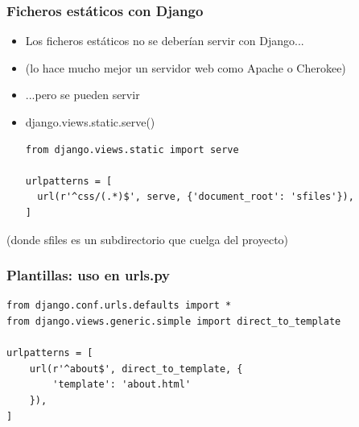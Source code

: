 
\begin{frame}[fragile]
\frametitle{Ficheros estáticos con Django}

\begin{itemize}
\item Los ficheros estáticos no se deberían servir con Django...
\item (lo hace mucho mejor un servidor web como Apache o Cherokee)
\item ...pero se pueden servir
\item django.views.static.serve()

\begin{verbatim}
from django.views.static import serve

urlpatterns = [
  url(r'^css/(.*)$', serve, {'document_root': 'sfiles'}),
]
\end{verbatim}

\end{itemize}

(donde sfiles es un subdirectorio que cuelga del proyecto)

\end{frame}



\begin{frame}[fragile]
\frametitle{Plantillas: uso en urls.py}

\begin{verbatim}
from django.conf.urls.defaults import *
from django.views.generic.simple import direct_to_template

urlpatterns = [
    url(r'^about$', direct_to_template, {
        'template': 'about.html'
    }),
]
\end{verbatim}
\end{frame}



